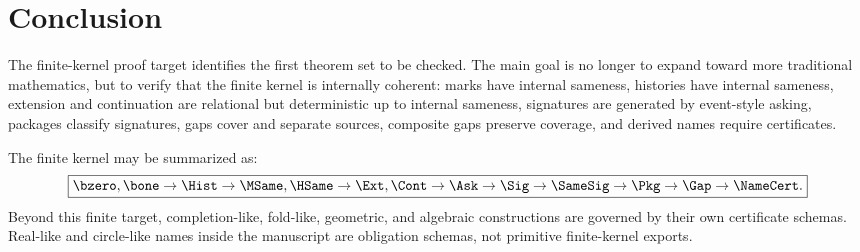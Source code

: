 \section{Conclusion}

The finite-kernel proof target identifies the first theorem set to be checked. The main goal is no longer to expand toward more traditional mathematics, but to verify that the finite kernel is internally coherent: marks have internal sameness, histories have internal sameness, extension and continuation are relational but deterministic up to internal sameness, signatures are generated by event-style asking, packages classify signatures, gaps cover and separate sources, composite gaps preserve coverage, and derived names require certificates.

The finite kernel may be summarized as:
$$
\boxed{
\bzero,\bone
\to \Hist
\to \MSame,\HSame
\to \Ext,\Cont
\to \Ask
\to \Sig
\to \SameSig
\to \Pkg
\to \Gap
\to \NameCert.
}
$$
Beyond this finite target, completion-like, fold-like, geometric, and algebraic constructions are governed by their own certificate schemas. Real-like and circle-like names inside the manuscript are obligation schemas, not primitive finite-kernel exports.
